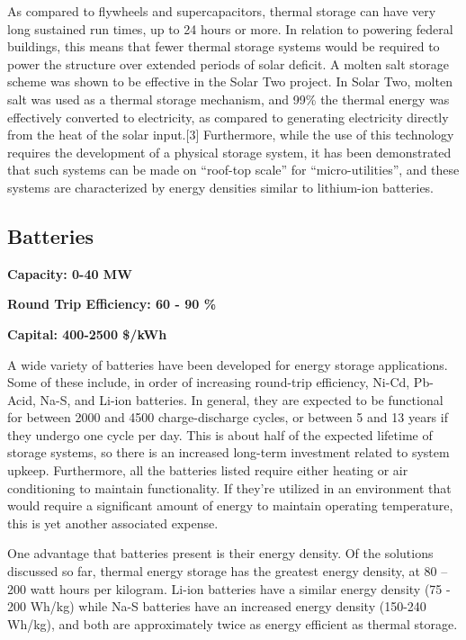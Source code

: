As compared to flywheels and supercapacitors, thermal storage can have very
long sustained run times, up to 24 hours or more. In relation to powering
federal buildings, this means that fewer thermal storage systems would be
required to power the structure over extended periods of solar deficit. A
molten salt storage scheme was shown to be effective in the Solar Two project.
In Solar Two, molten salt was used as a thermal storage mechanism, and 99\% the
thermal energy was effectively converted to electricity, as compared to
generating electricity directly from the heat of the solar input.[3]
Furthermore, while the use of this technology requires the development of a
physical storage system, it has been demonstrated that such systems can be made
on ``roof-top scale'' for ``micro-utilities'', and these systems are characterized
by energy densities similar to lithium-ion batteries.

\subsection{Batteries}
\textbf{Capacity: 0-40 MW}

\noindent\textbf{Round Trip Efficiency: 60 - 90 \%}

\noindent\textbf{Capital: 400-2500 \$/kWh}

A wide variety of batteries have been developed for energy storage
applications. Some of these include, in order of increasing round-trip
efficiency, Ni-Cd, Pb-Acid, Na-S, and Li-ion batteries. In general, they are
expected to be functional for between 2000 and 4500 charge-discharge cycles, or
between 5 and 13 years if they undergo one cycle per day. This is about half of
the expected lifetime of storage systems, so there is an increased long-term
investment related to system upkeep. Furthermore, all the batteries listed
require either heating or air conditioning to maintain functionality. If
they’re utilized in an environment that would require a significant amount of
energy to maintain operating temperature, this is yet another associated expense.

One advantage that batteries present is their energy density. Of the solutions
discussed so far, thermal energy storage has the greatest energy density, at 80
– 200 watt hours per kilogram. Li-ion batteries have a similar energy density
(75 - 200 Wh/kg) while Na-S batteries have an increased energy density (150-240
Wh/kg), and both are approximately twice as energy efficient as thermal
storage.

